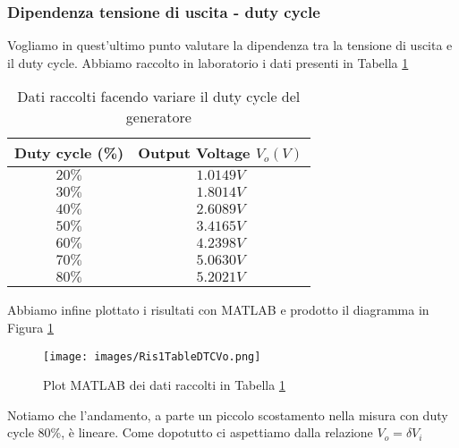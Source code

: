 \subsubsection{Dipendenza tensione di uscita - duty cycle}
Vogliamo in quest'ultimo punto valutare la dipendenza tra la tensione di uscita e il duty cycle. Abbiamo raccolto in laboratorio i dati presenti in Tabella \ref{tab:TabPlot}
\begin{table}[H]
    \centering
    \begin{tabular}{|c|c|}
        \hline
        Duty cycle (\%)&Output Voltage $V_o(V)$\\\hline\hline
        $20\%$&$1.0149V$\\\hline
        $30\%$&$1.8014V$\\\hline
        $40\%$&$2.6089V$\\\hline
        $50\%$&$3.4165V$\\\hline
        $60\%$&$4.2398V$\\\hline
        $70\%$&$5.0630V$\\\hline
        $80\%$&$5.2021V$\\\hline
    \end{tabular}
    \caption{Dati raccolti facendo variare il duty cycle del generatore}
    \label{tab:TabPlot}
\end{table}
Abbiamo infine plottato i risultati con MATLAB e prodotto il diagramma in Figura \ref{fig:MatlabPlot1}
\begin{figure}[H]
    \centering
    \texttt{[image: images/Ris1TableDTCVo.png]}
    \caption{Plot MATLAB dei dati raccolti in Tabella \ref{tab:TabPlot}}
    \label{fig:MatlabPlot1}
\end{figure}
Notiamo che l'andamento, a parte un piccolo scostamento nella misura con duty cycle 80\%, è lineare. Come dopotutto ci aspettiamo dalla relazione $V_o=\delta V_i$
